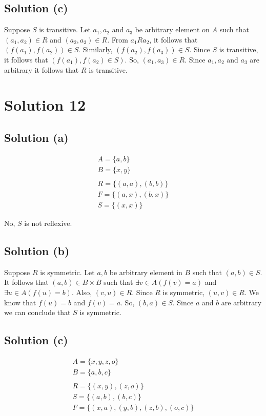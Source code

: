 \documentclass{article}
\begin{document}
\subsection{Solution (c)}
Suppose $S$ is transitive. Let $a_1, a_2$ and $a_3$ be arbitrary
element on $A$ such that $(a_1, a_2) \in R$ and $(a_2, a_3) \in R$.
From $a_1Ra_2$, it follows that $(f(a_1), f(a_2)) \in S$. Similarly,
$(f(a_2), f(a_3)) \in S$. Since $S$ is transitive, it follows that
$(f(a_1), f(a_2) \in S)$. So, $(a_1, a_3) \in R$. Since $a_1, a_2$ and
$a_3$ are arbitrary it follows that $R$ is transitive.

\section{Solution 12}
\subsection{Solution (a)}
\begin{align*}
  A = \{a,b\} \\
  B = \{x,y\} \\ \\
  R = \{(a,a), (b,b)\} \\
  F = \{(a,x), (b,x)\} \\
  S = \{(x,x)\}
\end{align*}

No, $S$ is not reflexive.

\subsection{Solution (b)}
Suppose $R$ is symmetric. Let $a,b$ be arbitrary element in $B$ such
that $(a,b) \in S$. It follows that $(a,b) \in B \times B$ such that
$\exists v \in A(f(v) = a)$ and $\exists u \in A(f(u) = b)$. Also,
$(v,u) \in R$. Since $R$ is symmetric, $(u,v) \in R$. We know that
$f(u) = b$ and $f(v) = a$. So, $(b,a) \in S$. Since $a$ and $b$ are
arbitrary we can conclude that $S$ is symmetric.

\subsection{Solution (c)}
\begin{align*}
  A = \{x,y,z,o\} \\
  B = \{a,b,c\} \\ \\
  R = \{(x,y), (z,o)\} \\
  S = \{(a,b), (b,c)\} \\
  F = \{(x,a), (y,b), (z,b), (o,c)\}
\end{align*}
\end{document}
